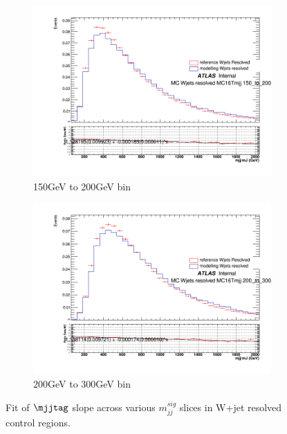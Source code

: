\begin{figure}[ht]
    \begin{subfigure}[b]{0.3\textwidth}
        \centering
        \includegraphics[width=\textwidth]{figures/mjjreweight1lep/resolved_Wjets150_to_200_GeVMC16T.png}
        \caption{150GeV to 200GeV bin}
        \label{fig:resolved_Wjets150to200}
    \end{subfigure}
    \begin{subfigure}[b]{0.3\textwidth}
        \centering
        \includegraphics[width=\textwidth]{figures/mjjreweight1lep/resolved_Wjets200_to_300_GeVMC16T.png}
        \caption{200GeV to 300GeV bin}
        \label{fig:resolved_Wjets200to300}
    \end{subfigure}
    \caption{Fit of \(\mjjtag\) slope across various \(m_{jj}^{sig}\) slices in W+jet resolved control regions.}
    \label{fig:mjjReweight1LepResPtBins}
\end{figure}

